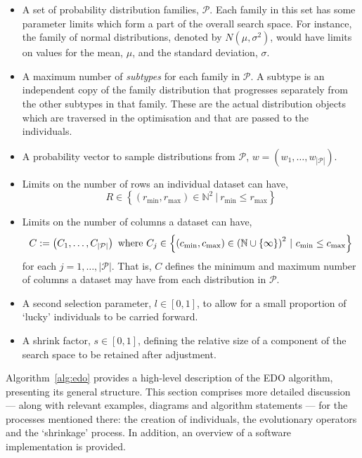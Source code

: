 \begin{itemize}
    \item A set of probability distribution families, \(\mathcal{P}\). Each
        family in this set has some parameter limits which form a part of the
        overall search space. For instance, the family of normal distributions,
        denoted by \(N(\mu, \sigma^2)\), would have limits on values for the
        mean, \(\mu\), and the standard deviation, \(\sigma\).
    \item A maximum number of \emph{subtypes} for each family in
        \(\mathcal{P}\). A subtype is an independent copy of the family
        distribution that progresses separately from the other subtypes in that
        family. These are the actual distribution objects which are traversed in
        the optimisation and that are passed to the individuals.
    \item A probability vector to sample distributions from \(\mathcal{P}\),
        \(w = \left(w_1, \ldots, w_{|\mathcal{P}|}\right)\).
    \item Limits on the number of rows an individual dataset can have,
        \vspace{-1ex}\[
            R \in \left\{%
                (r_{\min}, r_{\max}) \in \mathbb{N}^2~|~r_{\min} \leq r_{\max}
            \right\}
        \]\vspace{-2em}
    \item Limits on the number of columns a dataset can have,
        \vspace{-1ex}\[
            C := \left(C_1, \ldots, C_{|\mathcal{P}|}\right)
            \text{ where }
            C_j \in \left\{ (c_{\min}, c_{\max}) \in {%
                \left(\mathbb{N}\cup\{\infty\}\right)
            }^2~|~c_{\min} \leq c_{\max}\right\}
        \]
        for each \(j = 1, \ldots, |\mathcal{P}|\). That is, \(C\) defines the
        minimum and maximum number of columns a dataset may have from each
        distribution in \(\mathcal{P}\).
    \item A second selection parameter, \(l \in [0, 1]\), to allow for a
        small proportion of `lucky' individuals to be carried forward.
    \item A shrink factor, \(s \in [0, 1]\), defining the relative size of a
        component of the search space to be retained after adjustment.
\end{itemize}

Algorithm~\ref{alg:edo} provides a high-level description of the EDO algorithm,
presenting its general structure. This section comprises more detailed
discussion --- along with relevant examples, diagrams and algorithm statements
--- for the processes mentioned there: the creation of individuals, the
evolutionary operators and the `shrinkage' process. In addition, an overview of
a software implementation is provided.

